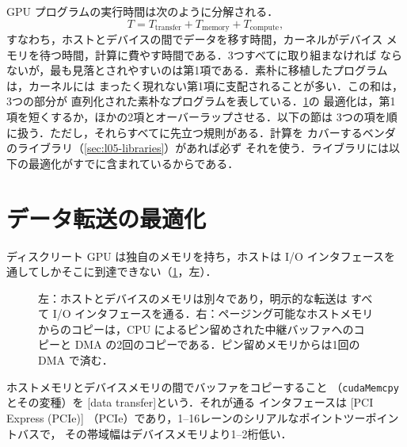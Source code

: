 \documentclass[../main.tex]{subfiles}
\begin{document}
GPU プログラムの実行時間は次のように分解される．
\begin{equation}
  T = T_{\text{transfer}} + T_{\text{memory}} + T_{\text{compute}},
  \label{eq:l05-time}
\end{equation}
すなわち，ホストとデバイスの間でデータを移す時間，カーネルがデバイス
メモリを待つ時間，計算に費やす時間である．3つすべてに取り組まなければ
ならないが，最も見落とされやすいのは第1項である．素朴に移植したプログラムは，カーネルには
まったく現れない第1項に支配されることが多い．この和は，3つの部分が
直列化された素朴なプログラムを表している．\cref{sec:l05-transfer}の
最適化は，第1項を短くするか，ほかの2項とオーバーラップさせる．以下の節は
3つの項を順に扱う．ただし，それらすべてに先立つ規則がある．計算を
カバーするベンダのライブラリ（\cref{sec:l05-libraries}）があれば必ず
それを使う．ライブラリには以下の最適化がすでに含まれているからである．

\section{データ転送の最適化}
\label{sec:l05-transfer}

ディスクリート GPU は独自のメモリを持ち，ホストは I/O インタフェースを
通してしかそこに到達できない（\cref{fig:l05-host-device}，左）．

\begin{figure}[tb]
  \centering
  \hspace{10mm}
  \caption{左：ホストとデバイスのメモリは別々であり，明示的な転送は
    すべて I/O インタフェースを通る．右：ページング可能なホストメモリ
    からのコピーは，CPU によるピン留めされた中継バッファへのコピーと
    DMA の2回のコピーである．ピン留めメモリからは1回の DMA で済む．}
  \label{fig:l05-host-device}
\end{figure}

\begin{definition}
  ホストメモリとデバイスメモリの間でバッファをコピーすること
  （\texttt{cudaMemcpy} とその変種）を
  [data transfer]という．それが通る
  インタフェースは
  [PCI Express (PCIe)]
  （PCIe）であり，1--16レーンのシリアルなポイントツーポイントバスで，
  その帯域幅はデバイスメモリより1--2桁低い．
\end{definition}
\end{document}
